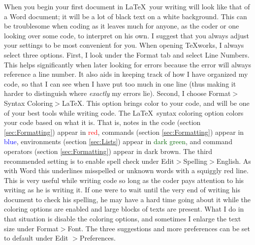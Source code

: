 \documentclass[10pt]{article}
\theoremstyle{Theorem}
\theoremstyle{definition}
\theoremstyle{custom}
\begin{document}
	\indent When you begin your first document in \LaTeX\ your writing will look like that of a Word document; it will be a lot of black text on a white background. This can be troublesome when coding as it leaves much for anyone, as the coder or one looking over some code, to interpret on his own. I suggest that you always adjust your settings to be most convenient for you. When opening \TeX works, I always select three options. First, I look under the Format tab and select Line Numbers. This helps significantly when later looking for errors because the error will always reference a line number. It also aids in keeping track of how I have organized my code, so that I can see when I have put too much in one line (thus making it harder to distinguish where \textit{exactly} my errors lie). Second, I choose Format$>$Syntax Coloring$>$LaTeX. This option brings color to your code, and will be one of your best tools while writing code. The \LaTeX\ syntax coloring option colors your code based on what it is. That is, notes in the code (section \ref{sec:Formatting}) appear in \textcolor{red}{red}, commands (section \ref{sec:Formatting}) appear in \textcolor{blue}{blue}, environments (section \ref{sec:Lists}) appear in \textcolor{darkgreen}{dark green}, and command operators (section \ref{sec:Formatting}) appear in \textcolor{darkbrown}{dark brown}. The third recommended setting is to enable spell check under Edit$>$Spelling$>$English. As with Word this underlines misspelled or unknown words with a squiggly red line. This is very useful while writing code so long as the coder pays attention to his writing as he is writing it. If one were to wait until the very end of writing his document to check his spelling, he may have a hard time going about it while the coloring options are enabled and large blocks of texts are present. What I do in that situation is disable the coloring options, and sometimes I enlarge the text size under Format$>$Font. The three suggestions and more preferences can be set to default under Edit $>$Preferences.

\newpage


\end{document}
